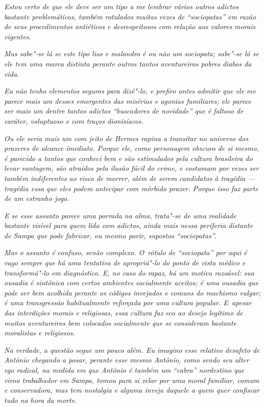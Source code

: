 \emph{Estou certo de que ele deve ser um tipo a me lembrar vários outros
adictos bastante problemáticos, também rotulados muitas vezes de
``sociopatas'' em razão de seus procedimentos antiéticos e
desrespeitosos com relação aos valores morais vigentes.}

\emph{Mas sabe"-se lá se este tipo liso e malandro é ou não um sociopata;
sabe"-se lá se ele tem uma marca distinta perante outros tantos
aventureiros pobres diabos da vida.}

\emph{Eu não tenho elementos seguros para dizê"-lo, e prefiro antes
admitir que ele me parece mais um desses emergentes das misérias e
agonias familiares; ele parece ser mais um dentre tantos adictos
``buscadores de novidade'' que é faltoso de caráter, voluptuoso e com
traços dionisíacos.}

\emph{Ou ele seria mais um com jeito de Hermes rapina a transitar no
universo dos prazeres de alcance imediato. Porque ele, como personagem
obscuro de si mesmo, é parecido a tantos que conheci bem e são
estimulados pela cultura brasileira do levar vantagem, são atraídos pela
ilusão fácil do crime, e costumam por vezes ser também indiferentes ao
risco de morrer, além de serem candidatos à tragédia --- tragédia essa
que eles podem antecipar com mórbido prazer. Porque isso faz parte de um
estranho jogo.}

\emph{E se esse assunto parece uma porrada na alma, trata"-se de uma
realidade bastante visível para quem lida com adictos, ainda mais nessa
periferia distante de Sampa que pode fabricar, ou mesmo parir, supostos
``sociopatas''.}

\emph{Mas o assunto é confuso, senão complexo. O~rótulo de ``sociopata''
por aqui é vago sempre que há uma tentativa de apropriá"-lo do ponto de
vista médico e transformá"-lo em diagnóstico. E, no caso do rapaz, há um
motivo razoável: sua ousadia é sintônica com certos ambientes
socialmente aceitos; é uma ousadia que pode ser bem acolhida perante os
códigos invejados e comuns do machismo vulgar; é uma transgressão
habitualmente reforçada por uma cultura popular. E~apesar das
interdições morais e religiosas, essa cultura faz eco ao desejo legítimo
de muitos aventureiros bem colocados socialmente que se consideram
bastante moralistas e religiosos.}

\emph{Na verdade, a questão segue um pouco além. Eu imagino esse
relativo desafeto de Antônio chegando a posar, perante esse mesmo
Antônio, como sendo seu alter ego radical, na medida em que Antônio é
também um ``cabra'' nordestino que virou trabalhador em Sampa, tomou
para si zelar por uma moral familiar, comum e conservadora, mas tem
nostalgia e alguma inveja daquele a quem quer confiscar tudo na hora da
morte.}

